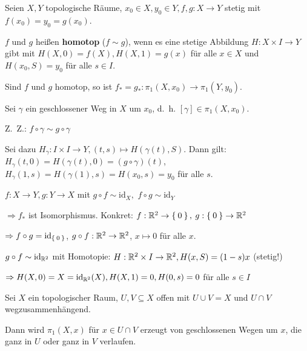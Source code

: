 \begin{definition}
    Seien $X, Y$ topologische Räume, $x_0 \in X, y_0 \in Y, f, g: X \rightarrow Y$
    stetig mit $f(x_0) = y_0 = g(x_0)$.

    $f$ und $g$ heißen \textbf{homotop} ($f \sim g$), wenn es eine stetige
    Abbildung $H: X \times I \rightarrow Y$ gibt mit $H(X,0) = f(X), H(X,1)=g(x)$
    für alle $x \in X$ und $H(x_0, S) = y_0$ für alle $s \in I$.
\end{definition}

\begin{korollar}
    Sind $f$ und $g$ homotop, so ist $f_* = g_*: \pi_1 (X, x_0) \rightarrow \pi_1(Y, y_0)$.
\end{korollar}

\begin{beweis}
    Sei $\gamma$ ein geschlossener Weg in $X$ um $x_0$, d.~h.
    $[\gamma] \in \pi_1 (X, x_0)$.

    Z.~Z.: $f \circ \gamma \sim g \circ \gamma$

    Sei dazu $H_\gamma: I \times I \rightarrow Y, (t,s) \mapsto H(\gamma(t), S)$.
    Dann gilt: $H_\gamma (t,0) = H(\gamma(t), 0) = (g \circ \gamma)(t)$,
    $H_\gamma(1,s) = H(\gamma(1), s) = H(x_0, s) = y_0$ für alle $s$.
\end{beweis}

\begin{beispiel}
    $f:X \rightarrow Y, g: Y \rightarrow X$ mit $g \circ f \sim \text{id}_X,$
    $f \circ g \sim \text{id}_Y$

    $\Rightarrow f_*$ ist Isomorphismus. Konkret: $f: \mathbb{R}^2 \rightarrow \Set{0},$
    $g:\Set{0} \rightarrow \mathbb{R}^2$

    $\Rightarrow f \circ g = \text{id}_{\Set{0}}$, $g \circ f: \mathbb{R}^2 \rightarrow \mathbb{R}^2$,
    $x \mapsto 0$ für alle $x$.

    $g \circ f \sim \text{id}_{\mathbb{R}^2}$ mit Homotopie: $H: \mathbb{R}^2 \times I \rightarrow \mathbb{R}^2, H(x,S) = (1-s) x$ (stetig!)

    $\Rightarrow H(X,0) = X = \text{id}_{\mathbb{R}^2} (X), H(X, 1) = 0, H(0, s) = 0$ für alle $s \in I$
\end{beispiel}

\begin{satz}\label{thm:seifert-van-kampen}
    Sei $X$ ein topologischer Raum, $U, V \subseteq X$ offen mit 
    $U \cup V = X$ und $U \cap V$ wegzusammenhängend.

    Dann wird $\pi_1(X,x)$ für $x \in U \cap V$ erzeugt von geschlossenen
    Wegen um $x$, die ganz in $U$ oder ganz in $V$ verlaufen.
\end{satz}


